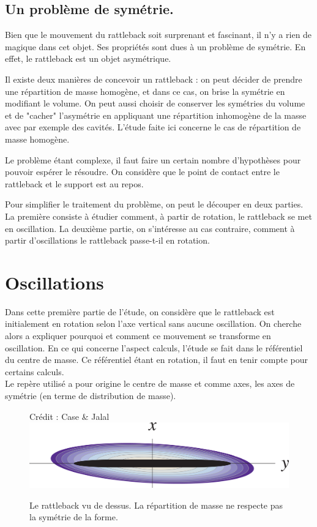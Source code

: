\documentclass[12pt,a4paper]{article}
\begin{document}
	\subsection{Un problème de symétrie.}
	Bien que le mouvement du rattleback soit surprenant et fascinant, il n'y a rien de magique dans cet objet. Ses propriétés sont dues à un problème de symétrie. En effet, le rattleback est un objet asymétrique.
	
	Il existe deux manières de concevoir un rattleback : on peut décider de prendre une répartition de masse homogène, et dans ce cas, on brise la symétrie en modifiant le volume. On peut aussi choisir de conserver les symétries du volume et de "cacher" l'asymétrie en appliquant une répartition inhomogène de la masse avec par exemple des cavités. L'étude faite ici concerne le cas de répartition de masse homogène.
	
	Le problème étant complexe, il faut faire un certain nombre d'hypothèses pour pouvoir espérer le résoudre.
	On considère que le point de contact entre le rattleback et le support est au repos.
	
	Pour simplifier le traitement du problème, on peut le découper en deux parties.\\
	La première consiste à étudier comment, à partir de rotation, le rattleback se met en oscillation. %
	La deuxième partie, on s'intéresse au cas contraire, comment à partir d'oscillations le rattleback passe-t-il en rotation.
	\section{Oscillations}
	Dans cette première partie de l'étude, on considère que le rattleback est initialement en rotation selon l'axe vertical sans aucune oscillation. On cherche alors a expliquer pourquoi et comment ce mouvement se transforme en oscillation.
	En ce qui concerne l'aspect calculs, l'étude se fait dans le référentiel du centre de masse. Ce référentiel étant en rotation, il faut en tenir compte pour certains calculs.\\
	Le repère utilisé a pour origine le centre de masse et comme axes, les axes de symétrie (en terme de distribution de masse).\\
	\begin{figure}[h]
		\centering
		\caption{Le rattleback vu de dessus. La répartition de masse ne respecte pas la symétrie de la forme.}{Crédit : Case \& Jalal}
		\label{fig:mass-repartition}
		\includegraphics[width=0.7\linewidth]{"mass repartition"}
	\end{figure}
	
\end{document}
